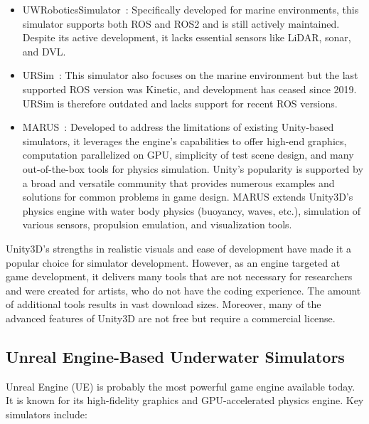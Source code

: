 \begin{itemize}


\item UWRoboticsSimulator~\cite{UwRoboticsSim}: Specifically developed for marine environments, this simulator supports both ROS and ROS2 and is still actively maintained. Despite its active development, it lacks essential sensors like LiDAR, sonar, and DVL.

\item URSim~\cite{URSim}: This simulator also focuses on the marine environment but the last supported ROS version was Kinetic, and development has ceased since 2019. URSim is therefore outdated and lacks support for recent ROS versions.

\item MARUS~\cite{Marus}: Developed to address the limitations of existing Unity-based simulators, it leverages the engine's capabilities to offer high-end graphics, computation parallelized on GPU, simplicity of test scene design, and many out-of-the-box tools for physics simulation. Unity’s popularity is supported by a broad and versatile community that provides numerous examples and solutions for common problems in game design. MARUS extends Unity3D’s physics engine with water body physics (buoyancy, waves, etc.), simulation of various sensors, propulsion emulation, and visualization tools.

\end{itemize}

Unity3D's strengths in realistic visuals and ease of development have made it a popular choice for simulator development. However, as an engine targeted at game development, it delivers many tools that are not necessary for researchers and were created for artists, who do not have the coding experience. The amount of additional tools results in vast download sizes. Moreover, many of the advanced features of Unity3D are not free but require a commercial license.



\subsection{Unreal Engine-Based Underwater Simulators}

Unreal Engine (UE) is probably the most powerful game engine available today. It is known for its high-fidelity graphics and GPU-accelerated physics engine. Key simulators include:

